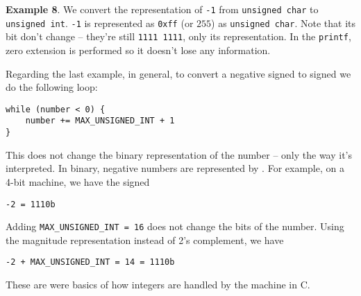 \textbf{Example 8}. We convert the representation of \texttt{-1} from \texttt{unsigned char} to \texttt{unsigned int}. \texttt{-1} is represented as \texttt{0xff} (or $255$) as \texttt{unsigned char}. Note that its bit don't change -- they're still \texttt{1111 1111}, only its representation. In the \texttt{printf}, zero extension is performed so it doesn't lose any information.

Regarding the last example, in general, to convert a negative signed to signed we do the following loop:
\begin{verbatim}
while (number < 0) {
    number += MAX_UNSIGNED_INT + 1
}
\end{verbatim}
This does not change the binary representation of the number -- only the way it's interpreted. In binary, negative numbers are represented by . For example, on a 4-bit machine, we have the signed
\begin{verbatim}
-2 = 1110b
\end{verbatim}
Adding \texttt{MAX\_UNSIGNED\_INT = 16} does not change the bits of the number. Using the magnitude representation instead of 2's complement, we have
\begin{verbatim}
-2 + MAX_UNSIGNED_INT = 14 = 1110b
\end{verbatim}

These are were basics of how integers are handled by the machine in C.






